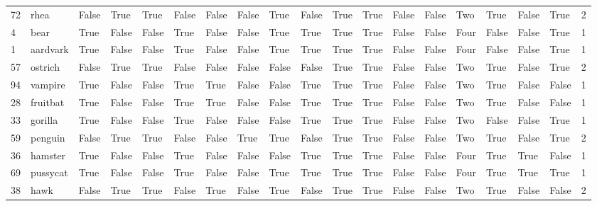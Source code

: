 \begin{tabular}{llllllllllllllllllr}
72  &        rhea &  False &      True &   True &  False &     False &    False &      True &    False &      True &      True &     False &  False &    Two &   True &     False &     True &           2 \\
4   &        bear &   True &     False &  False &   True &     False &    False &      True &     True &      True &      True &     False &  False &   Four &  False &     False &     True &           1 \\
1   &    aardvark &   True &     False &  False &   True &     False &    False &      True &     True &      True &      True &     False &  False &   Four &  False &     False &     True &           1 \\
57  &     ostrich &  False &      True &   True &  False &     False &    False &     False &    False &      True &      True &     False &  False &    Two &   True &     False &     True &           2 \\
94  &     vampire &   True &     False &  False &   True &      True &    False &     False &     True &      True &      True &     False &  False &    Two &   True &     False &    False &           1 \\
28  &    fruitbat &   True &     False &  False &   True &      True &    False &     False &     True &      True &      True &     False &  False &    Two &   True &     False &    False &           1 \\
33  &     gorilla &   True &     False &  False &   True &     False &    False &     False &     True &      True &      True &     False &  False &    Two &  False &     False &     True &           1 \\
59  &     penguin &  False &      True &   True &  False &     False &     True &      True &    False &      True &      True &     False &  False &    Two &   True &     False &     True &           2 \\
36  &     hamster &   True &     False &  False &   True &     False &    False &     False &     True &      True &      True &     False &  False &   Four &   True &      True &    False &           1 \\
69  &    pussycat &   True &     False &  False &   True &     False &    False &      True &     True &      True &      True &     False &  False &   Four &   True &      True &     True &           1 \\
38  &        hawk &  False &      True &   True &  False &      True &    False &      True &    False &      True &      True &     False &  False &    Two &   True &     False &    False &           2 \\

\end{tabular}
